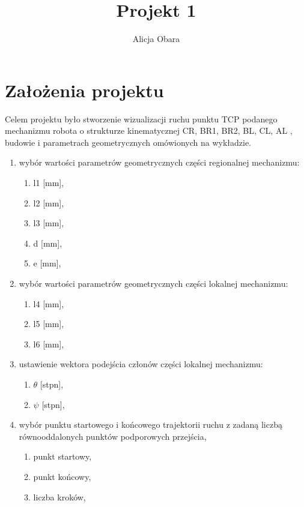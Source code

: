 \documentclass[a4paper]{article}
\begin{document}
	\renewcommand{\*}{\cdot}
	\renewcommand{\phi}{\varphi}
	\begin{titlepage}
		\author{Alicja Obara}
		\title{Projekt 1}
		\maketitle
	\end{titlepage}
	
	\section{Założenia projektu}
	Celem projektu było stworzenie wizualizacji ruchu punktu TCP podanego mechanizmu robota o strukturze kinematycznej {CR, BR1, BR2, BL, CL, AL }, budowie i parametrach geometrycznych omówionych na wykładzie.
	\begin{enumerate}
		\item wybór wartości parametrów geometrycznych części regionalnej mechanizmu: 
		\begin{enumerate}
			\item l1 [mm],
			\item l2 [mm],
			\item l3 [mm],
			\item d [mm],
			\item e [mm],
		\end{enumerate}
		\item wybór wartości parametrów geometrycznych części lokalnej mechanizmu:
		\begin{enumerate}
			\item l4 [mm],
			\item l5 [mm],
			\item l6 [mm],
		\end{enumerate}
		\item ustawienie wektora podejścia członów części lokalnej mechanizmu:
		\begin{enumerate}
			\item $\theta$ [stpn],
			\item $\psi$ [stpn],
		\end{enumerate}
		\item wybór punktu startowego i końcowego trajektorii ruchu z zadaną liczbą równooddalonych punktów podporowych przejścia,
		\begin{enumerate}
			\item punkt startowy,
			\item punkt końcowy,
			\item liczba kroków,

\end{enumerate}
\end{enumerate}
\end{document}
